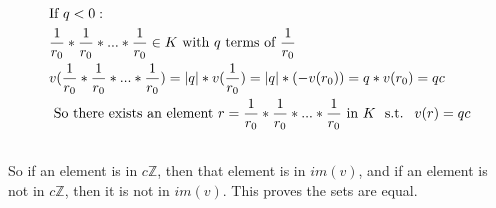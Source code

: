 \documentclass[11pt]{article}
\newcommand{\B}[1]{%
	\mathbb{#1}
}
\newcommand{\st}{
	\text{ s.t. }
}
\begin{document}
{\begin{align*}
     &                                                                                                                                \\
     & \text{If $q < 0$}:                                                                                                             \\
     & \frac{1}{r_0}*\frac{1}{r_0}*...*\frac{1}{r_0} \in K \text{ with $q$ terms of $\frac{1}{r_0}$}                                  \\
     & v(\frac{1}{r_0}*\frac{1}{r_0}*...*\frac{1}{r_0}) = \vert q \vert *v(\frac{1}{r_0}) = \vert q \vert * (-v(r_0)) = q*v(r_0) = qc \\
     & \text{ So there exists an element $r = \frac{1}{r_0}*\frac{1}{r_0}*...*\frac{1}{r_0}$ in $K$ \st $v(r) = qc$}                  \\
     &                                                                                                                                \\
  \end{align*}
  So if an element is in $c \B{Z} $, then that element is in $im(v)$, and if an element is not in $c\B{Z}$, then it is not in $im(v)$. This proves the sets are equal.


}
\end{document}

